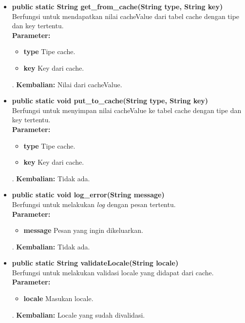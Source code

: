 \begin{enumerate}
\begin{itemize}
		\item \textbf{public static String get\_from\_cache(String type, String key)}\\
		Berfungsi untuk mendapatkan nilai cacheValue dari tabel cache dengan tipe dan key tertentu.\\
		\textbf{Parameter:}
				\begin{itemize}
					\item \textbf{type} Tipe cache.
					\item \textbf{key} Key dari cache.
				\end{itemize}.
		\textbf{Kembalian:}  Nilai dari cacheValue.
	
		\item \textbf{public static void put\_to\_cache(String type, String key)}\\
		Berfungsi untuk menyimpan nilai cacheValue ke tabel cache dengan tipe dan key tertentu.\\
		\textbf{Parameter:}
				\begin{itemize}
					\item \textbf{type} Tipe cache.
					\item \textbf{key} Key dari cache.
				\end{itemize}.
		\textbf{Kembalian:}  Tidak ada.
	
	
		\item \textbf{public static void log\_error(String message)}\\
		Berfungsi untuk melakukan \textit{log} dengan pesan tertentu.\\
		\textbf{Parameter:}
				\begin{itemize}
					\item \textbf{message} Pesan yang ingin dikeluarkan.
				\end{itemize}.
		\textbf{Kembalian:}  Tidak ada.
		
		\item \textbf{public static String validateLocale(String locale)}\\
		Berfungsi untuk melakukan validasi locale yang didapat dari cache.\\
		\textbf{Parameter:}
				\begin{itemize}
					\item \textbf{locale} Masukan locale.
				\end{itemize}.
		\textbf{Kembalian:}  Locale yang sudah divalidasi.
		

\end{itemize}
\end{enumerate}
